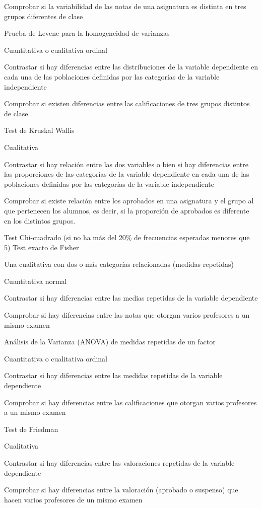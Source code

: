 \documentclass[
  spanish,
  a4paper,
]{scrreport}
\theoremstyle{definition}
\theoremstyle{definition}
\theoremstyle{remark}
\begin{document}
Comprobar si la variabilidad de las notas de una asignatura es distinta
en tres grupos diferentes de clase

Prueba de Levene para la homogeneidad de varianzas

Cuantitativa o cualitativa ordinal

Contrastar si hay diferencias entre las distribuciones de la variable
dependiente en cada una de las poblaciones definidas por las categorías
de la variable independiente

Comprobar si existen diferencias entre las calificaciones de tres grupos
distintos de clase

Test de Kruskal Wallis

Cualitativa

Contrastar si hay relación entre las dos variables o bien si hay
diferencias entre las proporciones de las categorías de la variable
dependiente en cada una de las poblaciones definidas por las categorías
de la variable independiente

Comprobar si existe relación entre los aprobados en una asignatura y el
grupo al que pertenecen los alumnos, es decir, si la proporción de
aprobados es diferente en los distintos grupos.

Test Chi-cuadrado (si no ha más del 20\% de frecuencias esperadas
menores que 5) Test exacto de Fisher

Una cualitativa con dos o más categorías relacionadas (medidas
repetidas)

Cuantitativa normal

Contrastar si hay diferencias entre las medias repetidas de la variable
dependiente

Comprobar si hay diferencias entre las notas que otorgan varios
profesores a un mismo examen

Análisis de la Varianza (ANOVA) de medidas repetidas de un factor

Cuantitativa o cualitativa ordinal

Contrastar si hay diferencias entre las medidas repetidas de la variable
dependiente

Comprobar si hay diferencias entre las calificaciones que otorgan varios
profesores a un mismo examen

Test de Friedman

Cualitativa

Contrastar si hay diferencias entre las valoraciones repetidas de la
variable dependiente

Comprobar si hay diferencias entre la valoración (aprobado o suspenso)
que hacen varios profesores de un mismo examen
\end{document}
